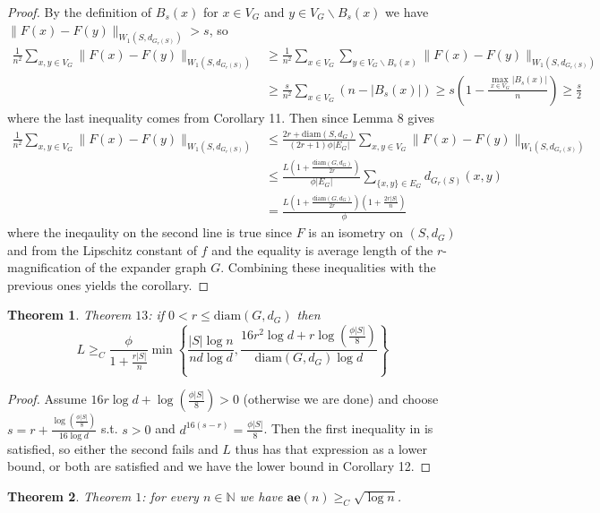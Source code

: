 \documentclass[10pt]{article}
\newtheorem{theorem}{Theorem}[section]
\theoremstyle{definition}
\theoremstyle{definition}
\theoremstyle{definition}
\theoremstyle{definition}
\newcommand*\circled[1]{\tikz[baseline=(char.base)]{
		\node[shape=circle,draw,inner sep=2pt] (char) {#1};}}
\begin{document}
\begin{proof}
By the definition of $B_s(x)$ for $x\in V_G$ and $y\in V_G\backslash B_s(x)$ we have $\|F(x)-F(y)\|_{W_1(S,d_{G_r(S)})}>s$, so
\begin{align*}
\frac{1}{n^2}\sum\limits_{x,y\in V_G}\|F(x)-F(y)\|_{W_1(S,d_{G_r(S)})}&\ge\frac{1}{n^2}\sum\limits_{x\in V_G}\sum\limits_{y\in V_G\backslash B_s(x)}\|F(x)-F(y)\|_{W_1(S,d_{G_r(S)})}\\
&\ge\frac{s}{n^2}\sum\limits_{x\in V_G}(n-|B_s(x)|)\ge s\left(1-\frac{\max\limits_{x\in V_G}|B_s(x)|}{n}\right)\ge\frac{s}{2}
\end{align*}
where the last inequality comes from Corollary 11. Then since Lemma 8 gives
\begin{align*}
\frac{1}{n^2}\sum\limits_{x,y\in V_G}\|F(x)-F(y)\|_{W_1(S,d_{G_r(S)})}&\le\frac{2r+\textrm{diam}(S,d_G)}{(2r+1)\phi|E_G|}\sum\limits_{x,y\in V_G}\|F(x)-F(y)\|_{W_1(S,d_{G_r(S)})}\\
&\le\frac{L\left(1+\frac{\textrm{diam}(G,d_G)}{2r}\right)}{\phi|E_G|}\sum\limits_{\{x,y\}\in E_G}d_{G_r(S)}(x,y)\\
&=\frac{L\left(1+\frac{\textrm{diam}(G,d_G)}{2r}\right)\left(1+\frac{2r|S|}{n}\right)}{\phi}
\end{align*}
where the ineqaulity on the second line is true since $F$ is an isometry on $(S,d_G)$ and from the Lipschitz constant of $f$ and the equality is average length of the $r$-magnification of the expander graph $G$. Combining these inequalities with the previous ones yields the corollary.
\end{proof}
\begin{theorem} Theorem $13$: if $0<r\le\textrm{diam}(G,d_G)$ then 
$$L\ge_C\frac{\phi}{1+\frac{r|S|}{n}}\min\left\{\frac{|S|\log n}{nd\log d},\frac{16r^2\log d+r\log\left(\frac{\phi|S|}{8}\right)}{\textrm{diam}(G,d_G)\log d}\right\}$$
\end{theorem}
\begin{proof}
Assume $16r\log d+\log\left(\frac{\phi|S|}{8}\right)>0$ (otherwise we are done) and choose $s=r+\frac{\log\left(\frac{\phi|S|}{8}\right)}{16\log d}$ s.t. $s>0$ and $d^{16(s-r)}=\frac{\phi|S|}{8}$. Then the first inequality in \circled{3} is satisfied, so either the second fails and $L$ thus has that expression as a lower bound, or both are satisfied and we have the lower bound in Corollary 12.
\end{proof}
\begin{theorem} Theorem $1$: for every $n\in\mathbb{N}$ we have $\textbf{ae}(n)\ge_C\sqrt{\log n}$.
\end{theorem}
\end{document}
